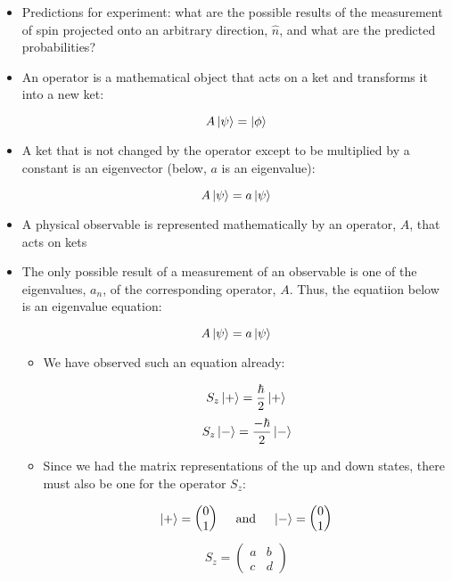 \begin{itemize}

  \item Predictions for experiment: what are the possible results of the measurement of spin projected onto an arbitrary direction, $\hat{n}$, and what are the predicted probabilities?

  \item An operator is a mathematical object that acts on a ket and transforms it into a new ket:

    $$A\ket{\psi}=\ket{\phi}$$

  \item A ket that is not changed by the operator except to be multiplied by a constant is an eigenvector (below, $a$ is an eigenvalue):

    $$A\ket{\psi}=a\ket{\psi}$$

  \item A physical observable is represented mathematically by an operator, $A$, that acts on kets

  \item The only possible result of a measurement of an observable is one of the eigenvalues, $a_n$, of the corresponding operator, $A$. Thus, the equatiion below is an eigenvalue equation:

    $$A\ket{\psi}=a\ket{\psi}$$

    \begin{itemize}

      \item We have observed such an equation already:

        $$S_z\ket{+}=\frac{\hbar}{2}\ket{+}$$
        $$S_z\ket{-}=\frac{-\hbar}{2}\ket{-}$$

      \item Since we had the matrix representations of the up and down states, there must also be one for the operator $S_z$:

        $$\ket{+}=\left( \begin{matrix} 0\\ 1\end{matrix} \right)\quad\text{ and }\quad\ket{-}=\left( \begin{matrix} 0\\ 1\end{matrix} \right)$$
        $$S_z=\left( \begin{matrix} a & b\\ c & d\end{matrix} \right)$$


\end{itemize}
\end{itemize}
